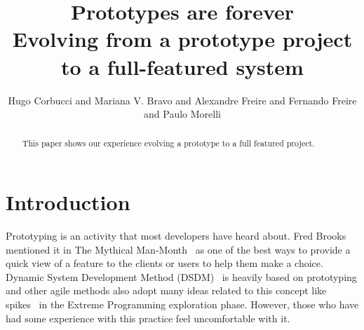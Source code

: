 \documentclass[lnbip]{svmultln}
\begin{document}
%
\mainmatter              %
%
\title{Prototypes are forever\\
  Evolving from a prototype project\\ to a full-featured system}
%
%
\author{Hugo Corbucci and Mariana V. Bravo  and
  Alexandre Freire and Fernando Freire and Paulo Morelli}
%
%
%
%

\maketitle              %

\begin{abstract}        %

This paper shows our experience evolving a prototype to a full featured project.
\end{abstract}
%
\section{Introduction}

Prototyping is an activity that most developers have heard about. Fred
Brooks mentioned it in The Mythical Man-Month~\cite{Brooks1975} as one
of the best ways to provide a quick view of a feature to the clients
or users to help them make a choice. Dynamic System Development Method
(DSDM)~\cite{DSDM} is heavily based on prototyping and other agile
methods also adopt many ideas related to this concept like spikes~\cite{XP} in
the Extreme Programming exploration phase. However, those who have had some
experience with this practice feel uncomfortable with it\cite{quem disse? esse
tipo de afirmação é sempre bom ter uma citação, já apanhei bastante sobre isso.
ale}.
\end{document}
